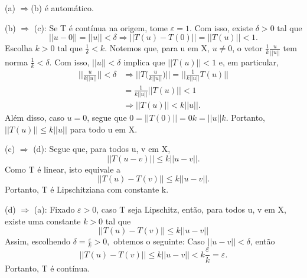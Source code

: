 \documentclass[MetricSpaces/metric_notes.tex]{subfiles}
\begin{document}
\begin{proof*}
	(a) \(\Rightarrow \)(b) é automático.

	(b) \(\Rightarrow \) (c): Se T é contínua na origem, tome \(\varepsilon = 1.\) Com isso, existe \(\delta > 0\) tal que
	\[
		||u-0|| = ||u|| < \delta \Rightarrow ||T(u)-T(0)|| = ||T(u)|| < 1.
	\]
	Escolha \(k > 0\) tal que \(\frac{1}{\delta } < k.\) Notemos que, para u em X, \(u\neq0\), o vetor
	\(\frac{1}{k}\frac{u}{||u||}\) tem norma \(\frac{1}{k} < \delta .\) Com isso, \(||u|| < \delta \) implica que
	\(||T(u)|| < 1\) e, em particular,
	\begin{align*}
		\biggl|\biggl|\frac{u}{k||u||}\biggr|\biggr| < \delta & \Rightarrow \biggl|\biggl|T \biggl(\frac{u}{k||u||}\biggr)\biggr|\biggr| = \biggl|\biggl|\frac{1}{k||u||}T(u)\biggr|\biggr| \\
		                                                      & = \frac{1}{k||u||}||T(u)|| < 1                                                                                              \\
		                                                      & \Rightarrow ||T(u)|| < k||u||.
	\end{align*}
	Além disso, caso \(u=0\), segue que \(0 = ||T(0)|| = 0k = ||u||k.\) Portanto, \(||T(u)||\leq k||u||\) para todo u em X.

	(c) \(\Rightarrow \) (d): Segue que, para todos u, v em X,
	\[
		||T(u-v)||\leq k||u-v||.
	\]
	Como T é linear, isto equivale a
	\[
		||T(u)-T(v)||\leq k||u-v||.
	\]
	Portanto, T é Lipschitziana com constante k.

	(d) \(\Rightarrow \) (a): Fixado \(\varepsilon > 0\), caso T seja Lipschitz, então, para todos u, v em X, existe uma constante \(k > 0\) tal que
	\[
		||T(u) - T(v)||\leq  k ||u-v||
	\]
	Assim, escolhendo \(\delta  = \frac{\varepsilon }{k} > 0,\) obtemos o seguinte: Caso \(||u-v|| < \delta \), então
	\[
		||T(u)-T(v)||\leq k||u-v|| < k \frac{\varepsilon }{k} = \varepsilon .
	\]
	Portanto, T é contínua. \qedsymbol

\end{proof*}
\end{document}
